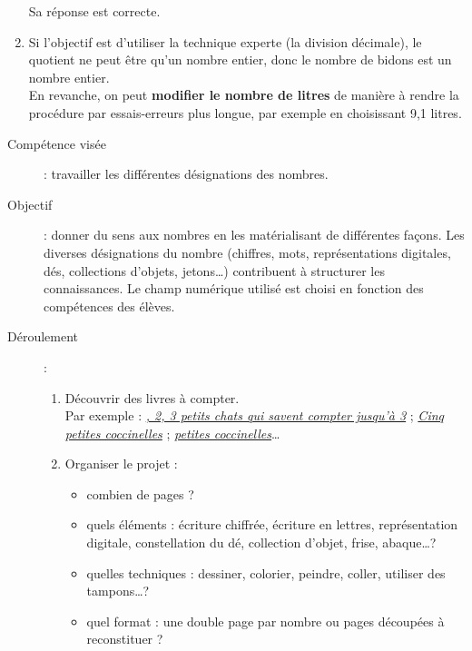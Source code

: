 \begin{corrige}
\begin{enumerate}
      Sa réponse est correcte. 
   \item Si l'objectif est d'utiliser la technique experte (la division décimale), le quotient ne peut être qu'un nombre entier, donc le nombre de bidons est un nombre entier. \\
   En revanche, on peut \textbf{modifier le nombre de litres} de manière à rendre la procédure par essais-erreurs plus longue, par exemple en choisissant 9,1 litres.
\end{enumerate}
\end{corrige}


\Recreation %

\setcounter{exercice}{0}
\begin{exercice*} %
   \begin{description}
      \item[Compétence visée] : travailler les différentes désignations des nombres.
      \item[Objectif] : donner du sens aux nombres en les matérialisant de différentes façons. Les diverses désignations du nombre (chiffres, mots, représentations digitales, dés, collections d'objets, jetons\dots) contribuent à structurer les connaissances. Le champ numérique utilisé est choisi en fonction des compétences des élèves. 
      \item[Déroulement] : 
      \begin{enumerate}
         \item Découvrir des livres à compter. \\
           Par exemple : \href{https://www.youtube.com/watch?v=6uPh8zpPias}{\it{}, 2, 3 petits chats qui savent compter jusqu'à 3} ; \href{https://www.youtube.com/watch?v=lQOk4qjXq0E}{\it\blue Cinq petites coccinelles} ; \href{https://www.glenat.com/histoires-pour-compter/dix-petites-coccinelles-9782841961924}{\it{} petites coccinelles}\dots
         \item Organiser le projet :
         \begin{itemize}
            \item combien de pages ?
            \item quels éléments : écriture chiffrée, écriture en lettres, représentation digitale, constellation du dé, collection d'objet, frise, abaque\dots ?
            \item quelles techniques : dessiner, colorier, peindre, coller, utiliser des tampons\dots ?
            \item quel format : une double page par nombre ou pages découpées à reconstituer ?

\end{itemize}
\end{enumerate}
\end{description}
\end{exercice*}
